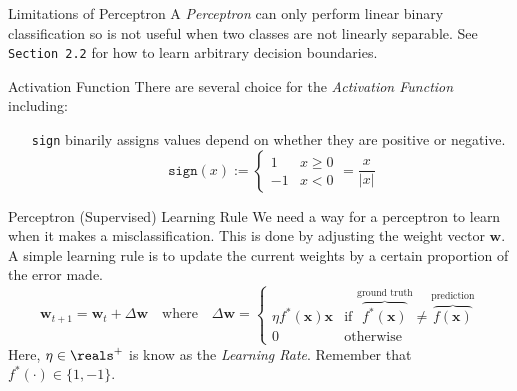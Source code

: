 \documentclass[11pt,a4paper]{article}
\begin{document}
  \begin{remark}{Limitations of Perceptron}
    A \textit{Perceptron} can only perform linear binary classification so is not useful when two classes are not linearly separable. See \texttt{Section 2.2} for how to learn arbitrary decision boundaries.
  \end{remark}

  \begin{proposition}{Activation Function}
    There are several choice for the \textit{Activation Function} including:
    \begin{itemize}
      \item[\texttt{sign}] binarily assigns values depend on whether they are positive or negative.
      \[ \mathtt{sign}(x):=\begin{cases}1&x\geq0\\-1&x<0\end{cases}=\frac{x}{|x|} \]
    \end{itemize}
  \end{proposition}

  \begin{proposition}{Perceptron (Supervised) Learning Rule}
    We need a way for a perceptron to learn when it makes a misclassification. This is done by adjusting the weight vector $\pmb{w}$. A simple learning rule is to update the current weights by a certain proportion of the error made.
    \[ \pmb{w}_{t+1}=\pmb{w}_t+\Delta\pmb{w}\quad\text{where}\quad\Delta\pmb{w}=\begin{cases}\eta f^*(\pmb{x})\pmb{x}&\text{if }\overbrace{f^*(\pmb{x})}^\text{ground truth}\neq \overbrace{f(\pmb{x})}^\text{prediction}\\0&\text{otherwise}\end{cases}\]
    Here, $\eta\in\reals^+$ is know as the \textit{Learning Rate}. Remember that $f^*(\cdot)\in\{1,-1\}$.
  \end{proposition}
\end{document}
